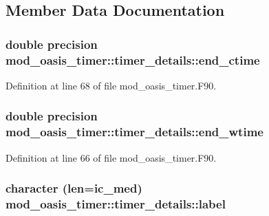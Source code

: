 \subsection{Member Data Documentation}
\hypertarget{structmod__oasis__timer_1_1timer__details_a6203f13dc289b25e994b08b837636afc}{
\subsubsection[{end\+\_\+ctime}]{\setlength{\rightskip}{0pt plus 5cm}double precision mod\+\_\+oasis\+\_\+timer\+::timer\+\_\+details\+::end\+\_\+ctime\hspace{0.3cm}{\ttfamily [private]}}}\label{structmod__oasis__timer_1_1timer__details_a6203f13dc289b25e994b08b837636afc}


Definition at line 68 of file mod\+\_\+oasis\+\_\+timer.\+F90.

\hypertarget{structmod__oasis__timer_1_1timer__details_af4ddda3c6547e993f367a5221671c50b}{
\subsubsection[{end\+\_\+wtime}]{\setlength{\rightskip}{0pt plus 5cm}double precision mod\+\_\+oasis\+\_\+timer\+::timer\+\_\+details\+::end\+\_\+wtime\hspace{0.3cm}{\ttfamily [private]}}}\label{structmod__oasis__timer_1_1timer__details_af4ddda3c6547e993f367a5221671c50b}


Definition at line 66 of file mod\+\_\+oasis\+\_\+timer.\+F90.

\hypertarget{structmod__oasis__timer_1_1timer__details_a772c22856aef70d86030ba7aed99f85d}{
\subsubsection[{label}]{\setlength{\rightskip}{0pt plus 5cm}character (len=ic\+\_\+med) mod\+\_\+oasis\+\_\+timer\+::timer\+\_\+details\+::label\hspace{0.3cm}{\ttfamily [private]}}}\label{structmod__oasis__timer_1_1timer__details_a772c22856aef70d86030ba7aed99f85d}


